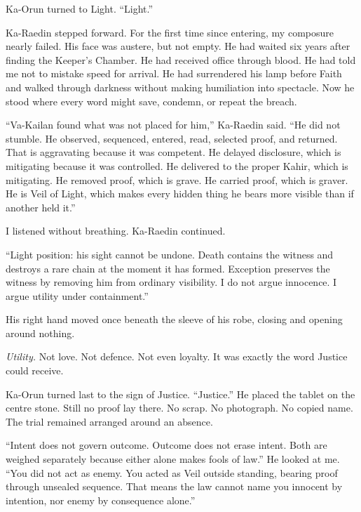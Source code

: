 Ka-Orun turned to Light. ``Light.''\par

Ka-Raedin stepped forward. For the first time since entering, my composure nearly failed. His face was austere, but not empty. He had waited six years after finding the Keeper's Chamber. He had received office through blood. He had told me not to mistake speed for arrival. He had surrendered his lamp before Faith and walked through darkness without making humiliation into spectacle. Now he stood where every word might save, condemn, or repeat the breach.\par

``Va-Kailan found what was not placed for him,'' Ka-Raedin said. ``He did not stumble. He observed, sequenced, entered, read, selected proof, and returned. That is aggravating because it was competent. He delayed disclosure, which is mitigating because it was controlled. He delivered to the proper Kahir, which is mitigating. He removed proof, which is grave. He carried proof, which is graver. He is Veil of Light, which makes every hidden thing he bears more visible than if another held it.''\par

I listened without breathing. Ka-Raedin continued.\par

``Light position: his sight cannot be undone. Death contains the witness and destroys a rare chain at the moment it has formed. Exception preserves the witness by removing him from ordinary visibility. I do not argue innocence. I argue utility under containment.''\par

His right hand moved once beneath the sleeve of his robe, closing and opening around nothing.\par

\emph{Utility.} Not love. Not defence. Not even loyalty. It was exactly the word Justice could receive.\par

Ka-Orun turned last to the sign of Justice. ``Justice.'' He placed the tablet on the centre stone. Still no proof lay there. No scrap. No photograph. No copied name. The trial remained arranged around an absence.\par

``Intent does not govern outcome. Outcome does not erase intent. Both are weighed separately because either alone makes fools of law.'' He looked at me. ``You did not act as enemy. You acted as Veil outside standing, bearing proof through unsealed sequence. That means the law cannot name you innocent by intention, nor enemy by consequence alone.''\par


